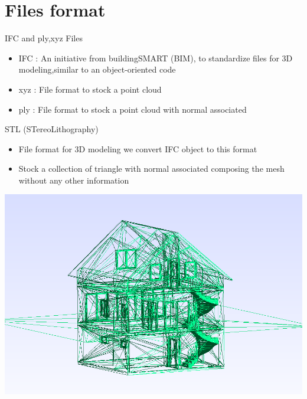 \documentclass[10pt]{beamer}
\begin{document}
\section{Files format}
\begin{frame}{IFC and ply,xyz Files}
\begin{itemize}
    \item IFC : An initiative from buildingSMART (BIM), to standardize files for 3D modeling,similar to  an object-oriented code 
    \item xyz : File format to stock a point cloud
    \item ply : File format to stock a point cloud with normal associated
\end{itemize}


\end{frame}
\begin{frame}{STL (STereoLithography)}
    \begin{itemize}
        \item File format for 3D modeling we convert IFC object to this format
        \item Stock a collection of triangle with normal associated composing  the mesh without any other information
    \end{itemize}
    \begin{center}
        \includegraphics[scale=0.3]{../../images/ACJASMINSTL.png}
    \end{center}
    
\end{frame}
\end{document}
